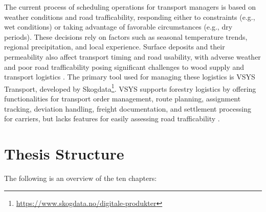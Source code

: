 The current process of scheduling operations for transport managers is based on weather conditions and road \gls{trafficability}, responding either to constraints (e.g., wet conditions) or taking advantage of favorable circumstances (e.g., dry periods). These decisions rely on factors such as seasonal temperature trends, regional precipitation, and local experience. Surface deposits and their \gls{permeability} also affect transport timing and road usability, with adverse weather and poor road \gls{trafficability} posing significant challenges to wood supply and transport logistics \cite[p.~2]{fjeld2023trafficability}. The primary tool used for managing these logistics is VSYS Transport, developed by Skogdata\footnote{\url{https://www.skogdata.no/digitale-produkter}}. VSYS supports forestry logistics by offering functionalities for transport order management, route planning, assignment tracking, deviation handling, freight documentation, and settlement processing for carriers, but lacks features for easily assessing road trafficability \cite{skogdata2024vsys}.

\section{Thesis Structure}

The following is an overview of the ten chapters:


